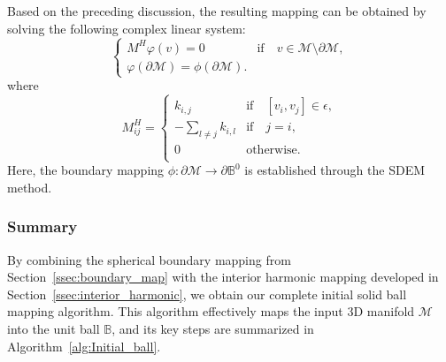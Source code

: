 \documentclass{article}
\begin{document}
Based on the preceding discussion, the resulting mapping can be obtained by solving the following complex linear system:
\begin{equation}
    \left \{
    \begin{array}{ll}
    M^{H} \varphi(v) = 0     & \text{if} \quad v\in \mathcal{M} \setminus \partial \mathcal{M}, \\
    \varphi\left(\partial \mathcal{M} \right) = \phi \left( \partial \mathcal{M} \right).   & 
    \end{array}    
    \right.
\end{equation}
where 
\begin{equation}
    M^{H}_{ij} = \left \{
    \begin{array}{ll}
     k_{i,j}    & \text{if} \quad \left[v_i,v_j \right] \in \epsilon, \\
     -\sum_{l\neq j} k_{i,l}    & \text{if} \quad j = i, \\
     0      & \text{otherwise}. \\
    \end{array}
    \right.
\end{equation}
Here, the boundary mapping $\phi: \partial \mathcal{M} \rightarrow \partial \mathbb B^0$ is established through the SDEM method.



\subsubsection{Summary}
By combining the spherical boundary mapping from Section~\ref{ssec:boundary_map} with the interior harmonic mapping developed in Section~\ref{ssec:interior_harmonic}, we obtain our complete initial solid ball mapping algorithm. This algorithm effectively maps the input 3D manifold $\mathcal{M}$ into the unit ball $\mathbb{B}$, and its key steps are summarized in Algorithm~\ref{alg:Initial_ball}.
\end{document}
